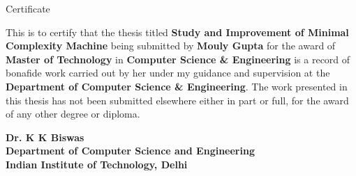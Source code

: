 \begin{center}
\LARGE{Certificate} 
\end{center}

\vspace{0.5in}

This is to certify that the thesis titled {\bfseries Study and Improvement of Minimal Complexity Machine} being submitted by
{\bfseries Mouly Gupta} for the award of {\bfseries Master of Technology} in {\bfseries Computer Science \& Engineering} is a record of bonafide work carried out by her under my guidance and supervision at the {\bfseries Department of Computer Science \& Engineering}. The work presented in this thesis has not been submitted elsewhere either in part or full, for the award of any other degree or diploma.

\vspace{1.5in}


{\bfseries Dr. K K Biswas} \\
{\bfseries Department of Computer Science and Engineering} \\
{\bfseries Indian Institute of Technology, Delhi}\\ 

